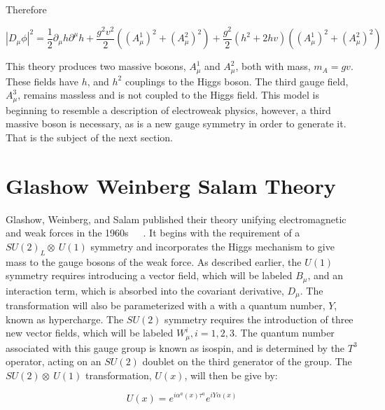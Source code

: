 \noindent Therefore

\begin{equation}\label{eq:non_abelian_higgs_mechanism_covariant_derivative_sq}
|D_{\mu}\phi|^{2} = \frac{1}{2}\partial_{\mu}h\partial^{\mu}h +
\frac{g^{2}v^{2}}{2}\left( (A_{\mu}^{1})^{2} + (A_{\mu}^{2})^{2} \right) +
\frac{g^{2}}{2}(h^{2}+2hv)\left( (A_{\mu}^{1})^{2} + (A_{\mu}^{2})^{2} \right)
\end{equation}

\par This theory produces two massive bosons, $A_{\mu}^{1}$ and
$A_{\mu}^{2}$, both with mass, $m_{A} = gv$.  These fields have $h$,
and $h^2$ couplings to the Higgs boson.  The third gauge field,
$A_{\mu}^{3}$, remains massless and is not coupled to the Higgs field.
This model is beginning to resemble a description of electroweak
physics, however, a third massive boson is necessary, as is a new
gauge symmetry in order to generate it.  That is the subject of the
next section.  

\section{Glashow Weinberg Salam Theory}
\label{ewk_overview}

\par Glashow, Weinberg, and Salam published their theory unifying
electromagnetic and weak forces in the
1960s~\cite{th:Weinberg_ModelOfLeptons}~\cite{th:Glashow_PartialSymmetries}~\cite{th:Salam_EWKInteractions}.
It begins with the requirement of a $SU(2)_{L}\otimes~U(1)$
symmetry and incorporates the Higgs mechanism to give mass to the gauge bosons
of the weak force.  As described earlier, the $U(1)$ symmetry requires
introducing a vector field, which will be labeled $B_{\mu}$, and an interaction term, which
is absorbed into the covariant derivative, $D_{\mu}$.  The
transformation will also be parameterized with a with a quantum
number, $Y$, known as hypercharge.  The $SU(2)$
symmetry requires the introduction of three new 
vector fields, which will be labeled $W_{\mu}^{i}, i = 1, 2, 3$.  The
quantum number associated with this gauge group is known as isospin,
and is determined by the $T^{3}$ operator, acting on an $SU(2)$
doublet on the third generator of the group. The $SU(2)\otimes~U(1)$
transformation, $U(x)$, will then be give by:   

\begin{equation}\label{eq:ewk_su2_su1_transformation}
U(x) = e^{i\alpha^{a}(x)\tau^{a}}e^{iY\alpha(x)}
\end{equation}

